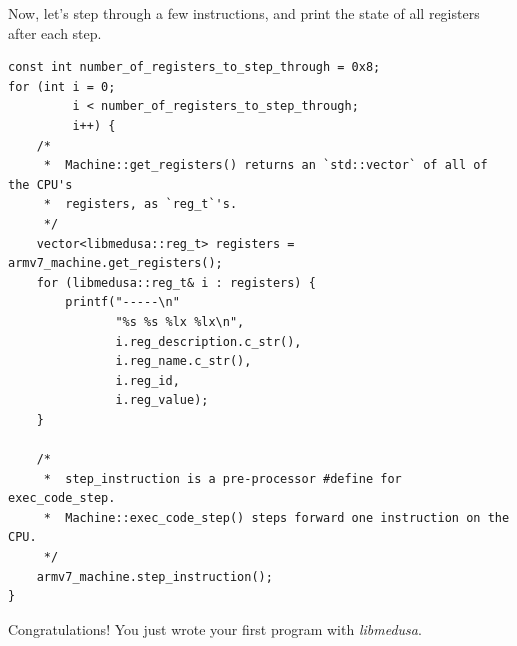 \documentclass{article}
\begin{document}
	Now, let's step through a few instructions, and print the state of all
	registers after each step.

	\begin{lstlisting}
const int number_of_registers_to_step_through = 0x8;
for (int i = 0;
		 i < number_of_registers_to_step_through;
		 i++) {
	/*
	 *  Machine::get_registers() returns an `std::vector` of all of the CPU's
	 *  registers, as `reg_t`'s.
	 */
	vector<libmedusa::reg_t> registers = armv7_machine.get_registers();
	for (libmedusa::reg_t& i : registers) {
		printf("-----\n"
			   "%s %s %lx %lx\n",
			   i.reg_description.c_str(),
			   i.reg_name.c_str(),
			   i.reg_id,
			   i.reg_value);
	}
	
	/*
	 *  step_instruction is a pre-processor #define for exec_code_step.
	 *  Machine::exec_code_step() steps forward one instruction on the CPU.
	 */
	armv7_machine.step_instruction();
}
	\end{lstlisting}

	Congratulations! You just wrote your first program with \textit{libmedusa}.
\end{document}

